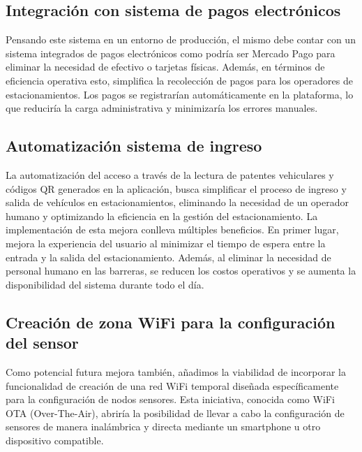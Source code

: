 
\subsection{Integración con sistema de pagos electrónicos}

Pensando este sistema en un entorno de producción, el mismo debe contar con un sistema integrados de pagos electrónicos como podría ser Mercado Pago para eliminar la necesidad de efectivo o tarjetas físicas. Además, en términos de eficiencia operativa esto, simplifica la recolección de pagos para los operadores de estacionamientos. Los pagos se registrarían automáticamente en la plataforma, lo que reduciría la carga administrativa y minimizaría los errores manuales.

\subsection{Automatización sistema de ingreso}{\label{automatizacion_ingreso}}
La automatización del acceso a través de la lectura de patentes vehiculares y códigos QR generados en la aplicación, busca simplificar el proceso de ingreso y salida de vehículos en estacionamientos, eliminando la necesidad de un operador humano y optimizando la eficiencia en la gestión del estacionamiento. La implementación de esta mejora conlleva múltiples beneficios. En primer lugar, mejora la experiencia del usuario al minimizar el tiempo de espera entre la entrada y la salida del estacionamiento. Además, al eliminar la necesidad de personal humano en las barreras, se reducen los costos operativos y se aumenta la disponibilidad del sistema durante todo el día.

\subsection{Creación de zona WiFi para la configuración del sensor}{\label{potencial_mejora_wifiOTA}}
Como potencial futura mejora también, añadimos la viabilidad de incorporar la funcionalidad de creación de una red WiFi temporal
diseñada específicamente para la configuración de nodos sensores. Esta iniciativa, conocida como WiFi OTA (Over-The-Air), 
abriría la posibilidad de llevar a cabo la configuración de sensores de manera inalámbrica y directa mediante un smartphone u otro dispositivo compatible.

